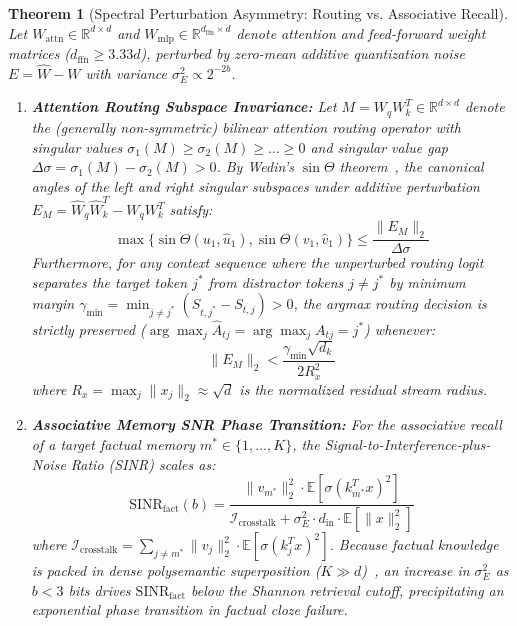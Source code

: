 \documentclass[10pt,twocolumn,letterpaper]{article}
\newtheorem{theorem}{Theorem}
\newcommand{\E}{\mathbb{E}}
\newcommand{\R}{\mathbb{R}}
\begin{document}
\begin{theorem}[Spectral Perturbation Asymmetry: Routing vs. Associative Recall]
\label{thm:asymmetry}
Let $W_{\text{attn}} \in \R^{d \times d}$ and $W_{\text{mlp}} \in \R^{d_{\text{ffn}} \times d}$ denote attention and feed-forward weight matrices ($d_{\text{ffn}} \ge 3.33d$), perturbed by zero-mean additive quantization noise $E = \widehat{W} - W$ with variance $\sigma_E^2 \propto 2^{-2b}$. 
\begin{enumerate}[leftmargin=*]
    \item \textbf{Attention Routing Subspace Invariance:} Let $M = W_q W_k^T \in \R^{d \times d}$ denote the (generally non-symmetric) bilinear attention routing operator with singular values $\sigma_1(M) \ge \sigma_2(M) \ge \dots \ge 0$ and singular value gap $\Delta \sigma = \sigma_1(M) - \sigma_2(M) > 0$. By Wedin's $\sin\Theta$ theorem~\cite{wedin1972perturbation}, the canonical angles of the left and right singular subspaces under additive perturbation $E_M = \widehat{W}_q \widehat{W}_k^T - W_q W_k^T$ satisfy:
    \begin{equation}
        \max\{ \sin\Theta(u_1, \widehat{u}_1), \sin\Theta(v_1, \widehat{v}_1) \} \le \frac{\|E_M\|_2}{\Delta \sigma}
    \end{equation}
    Furthermore, for any context sequence where the unperturbed routing logit separates the target token $j^*$ from distractor tokens $j \ne j^*$ by minimum margin $\gamma_{\min} = \min_{j \ne j^*} (S_{t, j^*} - S_{t, j}) > 0$, the argmax routing decision is strictly preserved ($\arg\max_j \widehat{A}_{tj} = \arg\max_j A_{tj} = j^*$) whenever:
    \begin{equation}
        \|E_M\|_2 < \frac{\gamma_{\min} \sqrt{d_k}}{2 R_x^2}
    \end{equation}
    where $R_x = \max_j \|x_j\|_2 \approx \sqrt{d}$ is the normalized residual stream radius.
    \item \textbf{Associative Memory SNR Phase Transition:} For the associative recall of a target factual memory $m^* \in \{1, \dots, K\}$, the Signal-to-Interference-plus-Noise Ratio (SINR) scales as:
    \begin{equation}
        \text{SINR}_{\text{fact}}(b) = \frac{\|v_{m^*}\|_2^2 \cdot \E[\sigma(k_{m^*}^T x)^2]}{\mathcal{I}_{\text{crosstalk}} + \sigma_E^2 \cdot d_{\text{in}} \cdot \E[\|x\|_2^2]}
        \label{eq:sinr_fact}
    \end{equation}
    where $\mathcal{I}_{\text{crosstalk}} = \sum_{j \ne m^*} \|v_j\|_2^2 \cdot \E[\sigma(k_j^T x)^2]$. Because factual knowledge is packed in dense polysemantic superposition ($K \gg d$)~\cite{elhage2022superposition}, an increase in $\sigma_E^2$ as $b < 3$ bits drives $\text{SINR}_{\text{fact}}$ below the Shannon retrieval cutoff, precipitating an exponential phase transition in factual cloze failure.
\end{enumerate}
\end{theorem}
\end{document}
